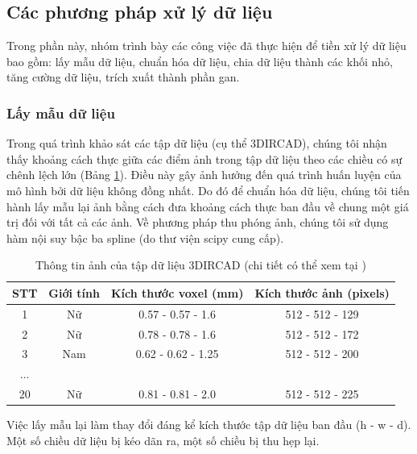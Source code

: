 \subsection{Các phương pháp xử lý dữ liệu} \label{data-process}
Trong phần này, nhóm trình bày các công việc đã thực hiện để tiền xử lý dữ liệu bao gồm: lấy mẫu dữ liệu, chuẩn hóa dữ liệu, chia dữ liệu thành các khối nhỏ, tăng cường dữ liệu, trích xuất thành phần gan.
\subsubsection{Lấy mẫu dữ liệu}
Trong quá trình khảo sát các tập dữ liệu (cụ thể 3DIRCAD), chúng tôi nhận thấy khoảng cách thực giữa các điểm ảnh trong tập dữ liệu theo các chiều có sự chênh lệch lớn (Bảng \ref{voxelsize}). Điều này gây ảnh hưởng đến quá trình huấn luyện của mô hình bởi dữ liệu không đồng nhất. Do đó để chuẩn hóa dữ liệu, chúng tôi tiến hành lấy mẫu lại ảnh bằng cách đưa khoảng cách thực ban đầu về chung một giá trị đối với tất cả các ảnh. Về phương pháp thu phóng ảnh, chúng tôi sử dụng hàm nội suy bậc ba spline (do thư viện scipy cung cấp).

\begin{table}[H]
    \centering
    \begin{tabular}{|c|c|c|c|}
    \hline
    \textbf{STT} & \textbf{Giới tính} & \textbf{Kích thước voxel (mm)} & \textbf{Kích thước ảnh (pixels)} \\ \hline
    1   & Nữ  & 0.57 - 0.57 - 1.6  & 512 - 512 - 129 \\ \hline
    2   & Nữ  & 0.78 - 0.78 - 1.6  & 512 - 512 - 172 \\ \hline
    3   & Nam & 0.62 - 0.62 - 1.25 & 512 - 512 - 200 \\ \hline
    ... &     &                    &                 \\ \hline
    20  & Nữ  & 0.81 - 0.81 - 2.0  & 512 - 512 - 225 \\ \hline
    \end{tabular}
    \caption{Thông tin ảnh của tập dữ liệu 3DIRCAD (chi tiết có thể xem tại \cite{3dircad})}
    \label{voxelsize}
\end{table}

Việc lấy mẫu lại làm thay đổi đáng kể kích thước tập dữ liệu ban đầu (h - w - d). Một số chiều dữ liệu bị kéo dãn ra, một số chiều bị thu hẹp lại.

